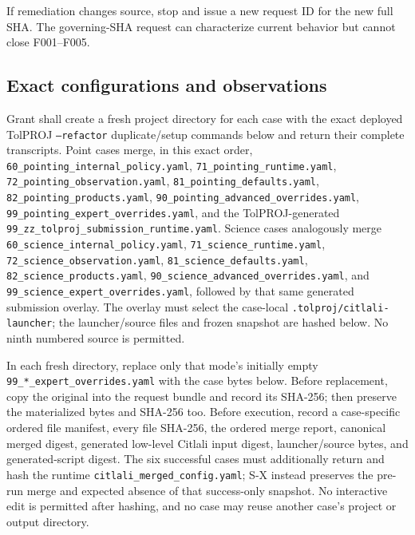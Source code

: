 \documentclass[11pt]{article}
\newcommand{\code}[1]{\nolinkurl{#1}}
\begin{document}
If remediation changes source, stop and issue a new request ID for the new full
SHA.  The governing-SHA request can characterize current behavior but cannot
close F001--F005.

\subsection*{Exact configurations and observations}

{\raggedright Grant shall create a fresh project directory for each case with
the exact deployed TolPROJ \texttt{--refactor} duplicate/setup commands below
and return their complete transcripts.  Point cases merge, in this exact order,
\code{60_pointing_internal_policy.yaml}, \code{71_pointing_runtime.yaml},
\code{72_pointing_observation.yaml}, \code{81_pointing_defaults.yaml},
\code{82_pointing_products.yaml}, \code{90_pointing_advanced_overrides.yaml},
 \code{99_pointing_expert_overrides.yaml}, and the TolPROJ-generated
\code{99_zz_tolproj_submission_runtime.yaml}.  Science cases analogously merge
\code{60_science_internal_policy.yaml}, \code{71_science_runtime.yaml},
\code{72_science_observation.yaml}, \code{81_science_defaults.yaml},
\code{82_science_products.yaml}, \code{90_science_advanced_overrides.yaml}, and
\code{99_science_expert_overrides.yaml}, followed by that same generated
submission overlay.  The overlay must select the case-local
\code{.tolproj/citlali-launcher}; the launcher/source files and frozen snapshot
are hashed below.  No ninth numbered source is permitted.\par}

In each fresh directory, replace only that mode's initially empty
\code{99_*_expert_overrides.yaml} with the case bytes below.  Before replacement,
copy the original into the request bundle and record its SHA-256; then preserve
the materialized bytes and SHA-256 too.  Before execution, record a case-specific
ordered file manifest, every file SHA-256, the ordered merge report, canonical
merged digest, generated low-level Citlali input digest, launcher/source bytes,
and generated-script digest.  The six successful cases must additionally return
and hash the runtime \code{citlali_merged_config.yaml}; S-X instead preserves the
pre-run merge and expected absence of that success-only snapshot.  No
interactive edit is permitted after hashing, and no case may reuse another
case's project or output directory.
\end{document}
